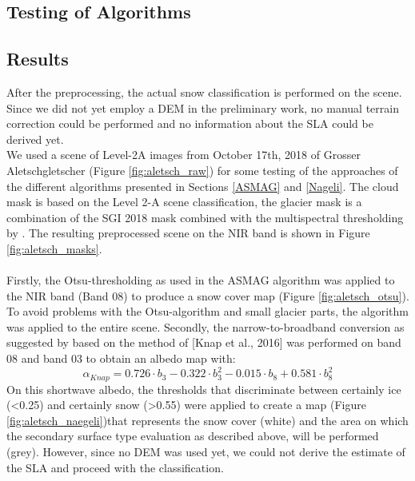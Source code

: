 \documentclass[12pt]{article}
\begin{document}
\subsection{Testing of Algorithms}
\subsection{Results}
After the preprocessing, the actual snow classification is performed on the scene. Since we did not yet employ a DEM in the preliminary work, no manual terrain correction could be performed and no information about the SLA could be derived yet.\\
We used a scene of Level-2A images from October 17th, 2018 of Grosser Aletschgletscher (Figure \ref{fig:aletsch_raw}) for some testing of the approaches of the different algorithms presented in Sections \ref{ASMAG} and \ref{Nageli}. The cloud mask is based on the Level 2-A scene classification, the glacier mask is a combination of the SGI 2018 mask combined with the multispectral thresholding by \cite{Paul2016}. The resulting preprocessed scene on the NIR band is shown in Figure \ref{fig:aletsch_masks}. \\
\\
Firstly, the Otsu-thresholding as used in the ASMAG algorithm was applied to the NIR band (Band 08) to produce a snow cover map (Figure \ref{fig:aletsch_otsu}). To avoid problems with the Otsu-algorithm and small glacier parts, the algorithm was applied to the entire scene.
Secondly, the narrow-to-broadband conversion as suggested by \cite{Naegeli2017} based on the method of [Knap et al., 2016] was performed on band 08 and band 03 to obtain an albedo map with:\\
\begin{equation}
\alpha_{Knap} = 0.726 \cdot b_3 - 0.322 \cdot b_3^2 -0.015 \cdot b_8 + 0.581 \cdot b_8^2
\end{equation}
On this shortwave albedo, the thresholds that discriminate between certainly ice (<0.25) and certainly snow (>0.55) were applied to create a map (Figure \ref{fig:aletsch_naegeli})that represents the snow cover (white) and the area on which the secondary surface type evaluation as described above, will be performed (grey). However, since no DEM was used yet, we could not derive the estimate of the SLA and proceed with the classification.\\
\\
\end{document}
